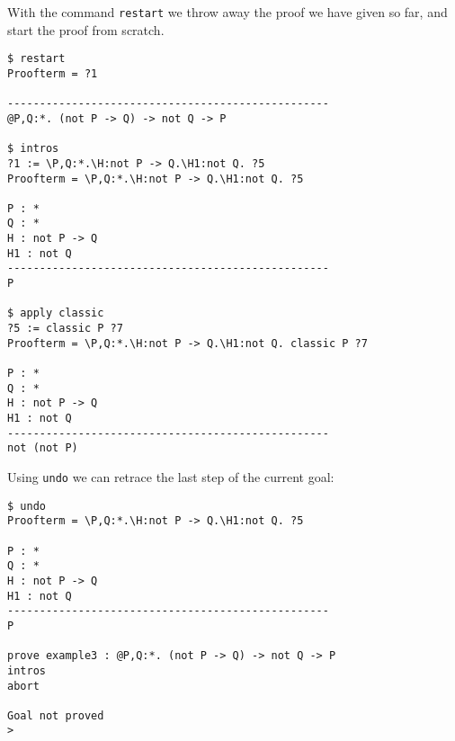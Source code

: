 With the command {\tt restart}
we throw away the proof we have given so far, and start the proof from
scratch.
\begin{verbatim}
$ restart
Proofterm = ?1

--------------------------------------------------
@P,Q:*. (not P -> Q) -> not Q -> P

$ intros
?1 := \P,Q:*.\H:not P -> Q.\H1:not Q. ?5
Proofterm = \P,Q:*.\H:not P -> Q.\H1:not Q. ?5

P : *
Q : *
H : not P -> Q
H1 : not Q
--------------------------------------------------
P

$ apply classic
?5 := classic P ?7
Proofterm = \P,Q:*.\H:not P -> Q.\H1:not Q. classic P ?7

P : *
Q : *
H : not P -> Q
H1 : not Q
--------------------------------------------------
not (not P)
\end{verbatim}

Using {\tt undo} we can retrace the last step of the current goal:
\begin{verbatim}
$ undo
Proofterm = \P,Q:*.\H:not P -> Q.\H1:not Q. ?5

P : *
Q : *
H : not P -> Q
H1 : not Q
--------------------------------------------------
P

prove example3 : @P,Q:*. (not P -> Q) -> not Q -> P
intros
abort

Goal not proved
>
\end{verbatim}

